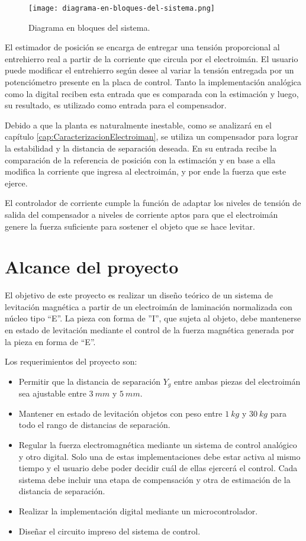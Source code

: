 \begin{figure}[H]
	\centering
	\texttt{[image: diagrama-en-bloques-del-sistema.png]}
	\caption{Diagrama en bloques del sistema.}
	\label{fig:img_diagrama-en-bloques-del-sistema}
\end{figure}

El estimador de posición se encarga de entregar una tensión proporcional al entrehierro real a partir de la corriente que circula por el electroimán. El usuario puede modificar el entrehierro según desee al variar la tensión entregada por un potenciómetro presente en la placa de control. Tanto la implementación analógica como la digital reciben esta entrada que es comparada con la estimación y luego, su resultado, es utilizado como entrada para el compensador.

Debido a que la planta es naturalmente inestable, como se analizará en el capítulo \ref{cap:CaracterizacionElectroiman}, se utiliza un compensador para lograr la estabilidad y la distancia de separación deseada. En su entrada recibe la comparación de la referencia de posición con la estimación y en base a ella modifica la corriente que ingresa al electroimán, y por ende la fuerza que este ejerce.

El controlador de corriente cumple la función de adaptar los niveles de tensión de salida del compensador a niveles de corriente aptos para que el electroimán genere la fuerza suficiente para sostener el objeto que se hace levitar.


\section{Alcance del proyecto}

El objetivo de este proyecto es realizar un diseño teórico de un sistema de levitación magnética a partir de un electroimán de laminación normalizada con núcleo tipo “E''. La pieza con forma de ”I”, que sujeta al objeto, debe mantenerse en estado de levitación mediante el control de la fuerza magnética generada por la pieza en forma de “E”.

Los requerimientos del proyecto son:

\begin{itemize}
\item Permitir que la distancia de separación $Y_{g}$ entre ambas piezas del electroimán sea ajustable entre $3\:mm$ y $5\:mm$.
\item Mantener en estado de levitación objetos con peso entre $1\:kg$ y $30\:kg$ para todo el rango de distancias de separación.
\item Regular la fuerza electromagnética mediante un sistema de control analógico y otro digital. Solo una de estas implementaciones debe estar  activa al mismo tiempo y el usuario debe poder decidir cuál de ellas ejercerá el control.  Cada sistema debe incluir una etapa de compensación y otra de estimación de la distancia de separación.
\item Realizar la implementación digital mediante un microcontrolador.
\item Diseñar el circuito impreso del sistema de control.
\end{itemize}


